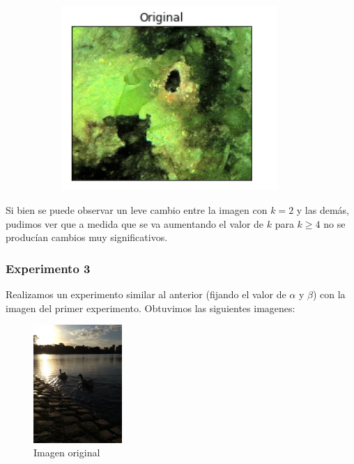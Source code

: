 \documentclass[10pt, a4paper]{article}
\begin{document}
\begin{figure}[H]
\begin{subfigure}{0.3\textwidth}
        \includegraphics[width=0.9\textwidth]{1906ax-k16.png}
    \end{subfigure}\hfill
\end{figure}

Si bien se puede observar un leve cambio entre la imagen con $k=2$ y las demás, pudimos ver que a medida que se va aumentando el valor de $k$ para $k \geq 4$ no se producían cambios muy significativos.

\subsubsection{Experimento 3}

Realizamos un experimento similar al anterior (fijando el valor de $\alpha$ y $\beta$) con la imagen del primer experimento. Obtuvimos las siguientes imagenes:

\begin{figure}[H]
	\centering
        \includegraphics[width=0.3\textwidth]{patitos1.jpg}
        \caption{Imagen original}
\end{figure}
\end{document}
